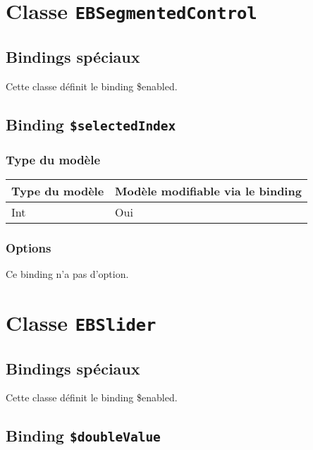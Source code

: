\section{Classe \texttt{EBSegmentedControl}}

\subsection{Bindings spéciaux}

Cette classe définit le binding \$enabled.

\subsection{Binding \texttt{\$selectedIndex}}

\subsubsection{Type du modèle}

\begin{tabular}{|l|l|}
\hline
\textbf{Type du modèle} & \textbf{Modèle modifiable via le binding}\\
\hline
Int & Oui\\
\hline
\end{tabular}
\subsubsection{Options}

Ce binding n'a pas d'option.








\section{Classe \texttt{EBSlider}}

\subsection{Bindings spéciaux}

Cette classe définit le binding \$enabled.

\subsection{Binding \texttt{\$doubleValue}}

